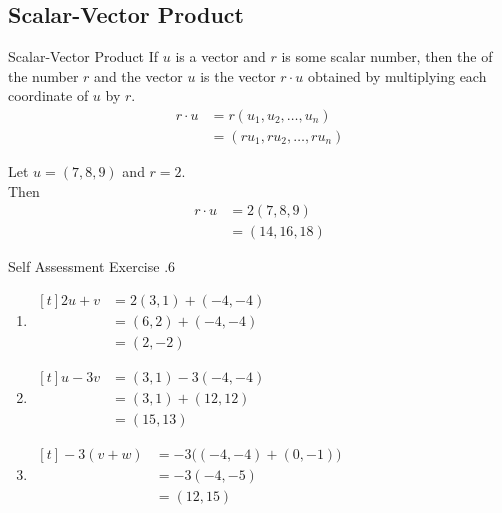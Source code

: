 \documentclass[\main/notes.tex]{subfiles}
\begin{document}
			\subsection{Scalar-Vector Product}
				\begin{definition}{Scalar-Vector Product}
					If $u$ is a vector and $r$ is some scalar number, then the  of the number $r$ and the vector $u$ is the vector $r \cdot u$ obtained by multiplying each coordinate of $u$ by $r$.
					\begin{align*}
						r\cdot u &= r(u_{1}, u_{2}, \ldots, u_{n})\\
						&= (ru_{1}, ru_{2}, \ldots, ru_{n})
					\end{align*}
				\end{definition}
				\begin{example}[width=0.5\textwidth]
					Let $u = (7, 8, 9)$ and $r = 2$.\\
					Then
					\begin{align*}
						r \cdot u &= 2(7, 8, 9)\\
						&= (14, 16, 18)
					\end{align*}
				\end{example}
				\begin{exercise}{Self Assessment Exercise \thechapter.6}
					\begin{enumerate}[label=(\alph*)]
						\item {} \hfill
							$ \begin{aligned}[t]
								2u + v &= 2(3, 1) + (-4, -4)\\
								&= (6, 2) + (-4, -4)\\
								&= (2, -2)
							\end{aligned} $ \hfill \phantom{}
						\item {} \hfill
							$ \begin{aligned}[t]
								u - 3v &= (3, 1) - 3(-4, -4)\\
								&= (3, 1) + (12, 12)\\
								&= (15, 13)
							\end{aligned} $ \hfill \phantom{}
						\item {} \hfill
							$ \begin{aligned}[t]
								-3(v + w) &= -3\bigl((-4, -4) + (0, -1)\bigr)\\
								&= -3(-4, -5)\\
								&= (12, 15)
							\end{aligned} $ \hfill \phantom{}
					\end{enumerate}
				\end{exercise}
			\pagebreak
\end{document}
